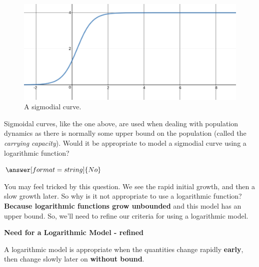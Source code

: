 \documentclass{ximera}
\begin{document}
\begin{question}

\begin{figure}
	\includegraphics[scale=1]{logarithmicGrowth.png}
	\caption{A sigmodial curve.}
\end{figure}

Sigmoidal curves, like the one above, are used when dealing with population dynamics as there is normally some upper bound on the population (called the \textit{carrying capacity}). Would it be appropriate to model a sigmodial curve using a logarithmic function?

$\answer[format=string]{No}$

\begin{feedback}
You may feel tricked by this question. We see the rapid initial growth, and then a slow growth later. So why is it not appropriate to use a logarithmic function? \textbf{Because logarithmic functions grow unbounded} and this model has an upper bound. So, we'll need to refine our criteria for using a logarithmic model.
\end{feedback}
\end{question}

\begin{theorem}
	\textbf{Need for a Logarithmic Model - refined}
	
	A logarithmic model is appropriate when the quantities change rapidly \textbf{early}, then change slowly later on \textbf{without bound}. 	
\end{theorem}
\end{document}
